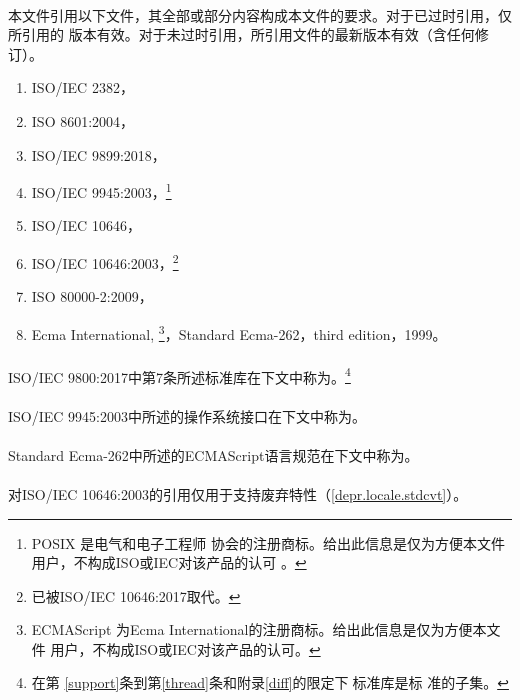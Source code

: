\paragraph{} %
本文件引用以下文件，其全部或部分内容构成本文件的要求。对于已过时引用，仅所引用的
版本有效。对于未过时引用，所引用文件的最新版本有效（含任何修订）。
\begin{enumerate}
  \item{ISO/IEC 2382，}
  \item{ISO 8601:2004，}
  \item{ISO/IEC 9899:2018，}
  \item{ISO/IEC 9945:2003，\footnote{POSIX \textregistered{}是电气和电子工程师
    协会的注册商标。给出此信息是仅为方便本文件用户，不构成ISO或IEC对该产品的认可
    。}}
  \item{ISO/IEC 10646，}
  \item{ISO/IEC 10646:2003，\footnote{已被ISO/IEC 10646:2017取代。}
    }
  \item{ISO 80000-2:2009，}
  \item{Ecma International,  \footnote{ECMAScript
    \textregistered{}为Ecma International的注册商标。给出此信息是仅为方便本文件
    用户，不构成ISO或IEC对该产品的认可。}，Standard
    Ecma-262，third edition，1999。}
\end{enumerate}

\paragraph{} %
ISO/IEC 9800:2017中第7条所述标准库在下文中称为。\footnote{在第
\ref{support}条到第\ref{thread}条和附录\ref{diff}的限定下，\c{}标准库是\cpp{}标
准的子集。}

\paragraph{} %
ISO/IEC 9945:2003中所述的操作系统接口在下文中称为。

\paragraph{} %
Standard Ecma-262中所述的ECMAScript语言规范在下文中称为。

\paragraph{} %
\begin{note}
对ISO/IEC 10646:2003的引用仅用于支持废弃特性（\ref{depr.locale.stdcvt}）。
\end{note}
